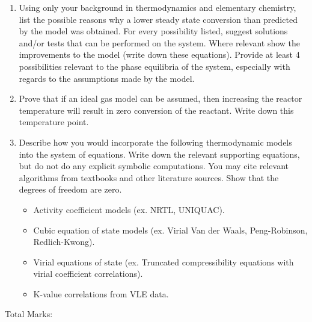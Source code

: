 \documentclass[12pt, A4paper]{article}
\begin{document}
\begin{enumerate}
\item Using  only your background in thermodynamics and elementary chemistry, list the possible reasons why a lower steady state conversion than predicted by the model was obtained. For every possibility listed, suggest solutions and/or tests that can be performed on the system. Where relevant show the improvements to the model (write down these equations). Provide at least 4 possibilities relevant to the phase equilibria of the system, especially with regards to the assumptions made by the model.  
\item Prove that if an ideal gas model can be assumed, then increasing the reactor temperature will result in zero conversion of the reactant. Write down this temperature point. 
\item Describe how you would incorporate the following thermodynamic models into the system of equations. Write down the relevant supporting equations, but do not do any explicit symbolic computations. You may cite relevant algorithms from textbooks and other literature sources. Show that the degrees of freedom are zero. %
\begin{itemize}
\item Activity coefficient models (ex. NRTL, UNIQUAC).  
\item Cubic equation of state models (ex. Virial Van der Waals, Peng-Robinson, Redlich-Kwong). 
\item Virial equations of state (ex. Truncated compressibility equations with virial coefficient correlations). 
\item K-value correlations from VLE data. 
\end{itemize}

\end{enumerate}

\begin{centering}
Total Marks: \\
\end{centering}


%

\end{document}
